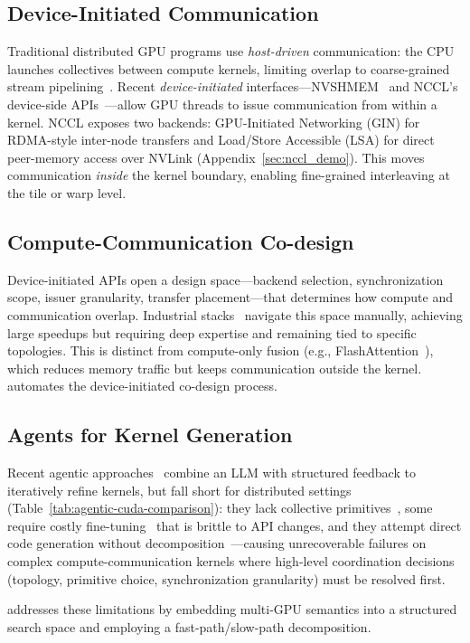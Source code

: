 \subsection{Device-Initiated Communication}
\vspace{-8pt}
Traditional distributed GPU programs use \emph{host-driven} communication: the CPU launches collectives between compute kernels, limiting overlap to coarse-grained stream pipelining~\cite{megatron-lm, coconet}. Recent \emph{device-initiated} interfaces---NVSHMEM~\cite{nvshmem} and NCCL's device-side APIs~\cite{nccl_deviceapi}---allow GPU threads to issue communication from within a kernel. NCCL exposes two backends: GPU-Initiated Networking (GIN) for RDMA-style inter-node transfers and Load/Store Accessible (LSA) for direct peer-memory access over NVLink (Appendix~\ref{sec:nccl_demo}). This moves communication \emph{inside} the kernel boundary, enabling fine-grained interleaving at the tile or warp level.

\vspace{-3pt}
\subsection{Compute-Communication Co-design}
\vspace{-3pt}
Device-initiated APIs open a design space---backend selection, synchronization scope, issuer granularity, transfer placement---that determines how compute and communication overlap. Industrial stacks~\cite{deepep2025, chang2024flux, gond2025tokenweave, licker2025rdmap2p} navigate this space manually, achieving large speedups but requiring deep expertise and remaining tied to specific topologies. This is distinct from compute-only fusion (e.g., FlashAttention~\cite{dao2023flashattention2fasterattentionbetter}), which reduces memory traffic but keeps communication outside the kernel. \cufuse{} automates the device-initiated co-design process.

\vspace{-8pt}
\subsection{Agents for Kernel Generation}
\vspace{-3pt}
Recent agentic approaches~\cite{concur,cudaforge,evoengineer} combine an LLM with structured feedback to iteratively refine kernels, but fall short for distributed settings (Table~\ref{tab:agentic-cuda-comparison}): they lack collective primitives~\cite{cudaforge,evoengineer}, some require costly fine-tuning~\cite{kevin, ouyang2025kernelbenchllmswriteefficient} that is brittle to API changes, and they attempt direct code generation without decomposition~\cite{lange2025robustagenticcudakernel}---causing unrecoverable failures on complex compute-communication kernels where high-level coordination decisions (topology, primitive choice, synchronization granularity) must be resolved first.

\cufuse{} addresses these limitations by embedding multi-GPU semantics into a structured search space and employing a fast-path/slow-path decomposition.
